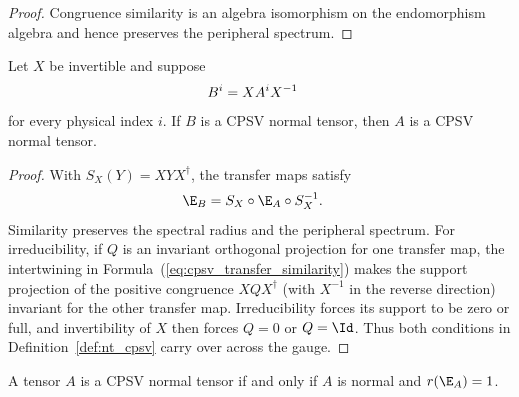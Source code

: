 \begin{proof}\leanok
    Congruence similarity is an algebra isomorphism on the endomorphism
    algebra and hence preserves the peripheral spectrum.
\end{proof}

\begin{lemma}
    \label{thm:cpsv_normal_tensor_gauge_transport}
    \leanok
    Let $X$ be invertible and suppose
    \begin{align}
        B^i
         & =XA^iX^{-1}
        \notag
    \end{align}
    for every physical index $i$. If $B$ is a CPSV normal tensor, then $A$ is
    a CPSV normal tensor.
\end{lemma}

\begin{proof}\leanok
    With $S_X(Y)=XYX^\dagger$, the transfer maps satisfy
    \begin{align}
        \E_B
         & = S_X\circ\E_A\circ S_X^{-1}.
        \label{eq:cpsv_transfer_similarity}
    \end{align}
    Similarity preserves the spectral radius and the peripheral spectrum.
    For irreducibility, if $Q$ is an invariant orthogonal projection for
    one transfer map, the intertwining in
    Formula~(\ref{eq:cpsv_transfer_similarity}) makes the support projection
    of the positive congruence $XQX^\dagger$ (with $X^{-1}$ in the reverse
    direction) invariant for the other transfer map. Irreducibility forces its
    support to be zero or full, and invertibility of $X$ then forces $Q=0$ or
    $Q=\Id$. Thus both conditions in Definition~\ref{def:nt_cpsv} carry over
    across the gauge.
\end{proof}

\begin{lemma}
    \label{thm:is_normal_tensor_iff_is_normal_spectral_radius_one}
    \leanok
    A tensor $A$ is a CPSV normal tensor if and only if $A$ is normal and
    $r(\E_A)=1$.
\end{lemma}

